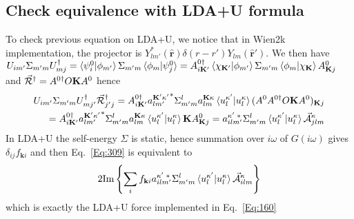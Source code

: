 \documentclass[aps,prb,floatfix,epsfig,singlecolumn,showpacs,preprintnumbers]{revtex4}
\renewcommand{\vr}{{\mathbf{r}}}
\newcommand{\vk}{{\mathbf{k}}}
\newcommand{\vK}{{\mathbf{K}}}
\newcommand{\cR}{{\cal R}}
\renewcommand{\Im}{\textrm{Im}}
\newcommand{\cA}{{\cal A}}
\begin{document}
\subsection{Check equivalence with LDA+U formula}
To check previous equation on LDA+U, we notice that in Wien2k
implementation, the projector is
$Y^*_{lm'}(\hat{\vr})\delta(r-r')Y_{lm}(\hat{\vr}')$. We then have
$U_{im'}\Sigma_{m'm}U^{\dagger}_{mj}=\braket{\psi^0_i|\phi_{m'}}\Sigma_{m'm}\braket{\phi_m|\psi^0_j}=
A^{0\dagger}_{i\vK'}\braket{\chi_{\vK'}|\phi_{m'}}\Sigma_{m'm}\braket{\phi_m|\chi_\vK}A^0_{\vK  j}$
and 
$\vec{\cR}^\dagger=A^{0\dagger} O \vK A^0$
hence
\begin{eqnarray}
U_{im'}\Sigma_{m'm}U^{\dagger}_{mj'}\vec{\cR}^\dagger_{j'j}
=A^{0\dagger}_{i\vK'} {a^{\vK'\kappa'}_{lm'}}^*\Sigma^l_{m'm}a^{\vK\kappa}_{lm}
\braket{u^{\kappa'}_l|u^\kappa_l}(A^0 A^{0\dagger} O \vK A^0)_{\vK j}\\
=A^{0\dagger}_{i\vK'} {a^{\vK'\kappa'}_{lm'}}^*\Sigma^l_{m'm}a^{\vK\kappa}_{lm}
\braket{u^{\kappa'}_l|u^\kappa_l}\vK A^0_{\vK j}
={a^{\kappa'\;*}_{ilm'}}\Sigma^l_{m'm}\braket{u^{\kappa'}_l|u^\kappa_l}\vec{\cA}^\kappa_{jlm}
\end{eqnarray}
In LDA+U the self-energy $\Sigma$ is static, hence summation over $i\omega$ of
$G(i\omega)$ gives  $\delta_{ij} f_{\vk i}$ and then Eq.~\ref{Eq:309}
is equivalent to
$$2\Im\left\{\sum_i f_{\vk i} {a^{\kappa'\;*}_{ilm'}}\Sigma^l_{m'm}\braket{u^{\kappa'}_l|u^\kappa_l}\vec{\cA}^\kappa_{ilm}\right\}$$
which is exactly the LDA+U force implemented in Eq.~\ref{Eq:160}
\end{document}
